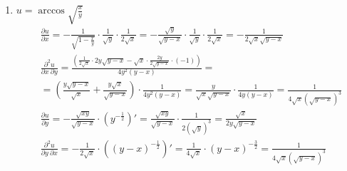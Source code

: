 \documentclass[a4paper, 12pt]{article}
\begin{document}
\begin{enumerate}
  \item %
  $u = \arccos\sqrt{\frac{x}{y}}$
  \begin{align*}
    &\boxed{\frac{\partial u}{\partial x}} =  -\frac{1}{\sqrt{1 -\frac{x}{y}}} \cdot \frac{1}{\sqrt{y}} \cdot \frac{1}{2\sqrt{x}} =
    -\frac{\sqrt{y}}{\sqrt{y-x}}\cdot\frac{1}{\sqrt{y}}\cdot\frac{1}{2\sqrt{x}} = \boxed{-\frac{1}{2\sqrt{x}\sqrt{y-x}}}\\
    &\boxed{\frac{\partial^2 u}{\partial x\:\partial y}} = \frac{\left(\frac{1}{2\sqrt{x}}\cdot 2y\sqrt{y-x} - \sqrt{x}\cdot \frac{2y}{2\sqrt{y-x}}\cdot (-1) \right)}{4y^2\left(y-x\right)} = \\
    &= \left(\frac{y\sqrt{y-x}}{\sqrt{x}} + \frac{y\sqrt{x}}{\sqrt{y-x}}\right) \cdot \frac{1}{4y^2\left(y-x\right)} = \frac{y}{\sqrt{x}\sqrt{y-x}} \cdot \frac{1}{4y\left(y-x\right)} = \boxed{\frac{1}{4\sqrt{x}\left(\sqrt{y-x}\right)^3}}\\
    &\boxed{\frac{\partial u}{\partial y}} = -\frac{\sqrt{xy}}{\sqrt{y-x}}\cdot\left(y^{-\frac{1}{2}}\right)' =
    \frac{\sqrt{xy}}{\sqrt{y-x}}\cdot \frac{1}{2(\sqrt{y})^3} = \boxed{\frac{\sqrt{x}}{2y\sqrt{y-x}}}\\
    &\boxed{\frac{\partial^2 u}{\partial y\:\partial x}} = -\frac{1}{2\sqrt{x}}\cdot \left(\left(y-x\right)^{-\frac{1}{2}}\right)' =
    \frac{1}{4\sqrt{x}} \cdot \left(y-x\right)^{-\frac{3}{2}} = \boxed{\frac{1}{4\sqrt{x}\left(\sqrt{y-x}\right)^3}}
  \end{align*}
  \end{enumerate}
  
\end{document}
